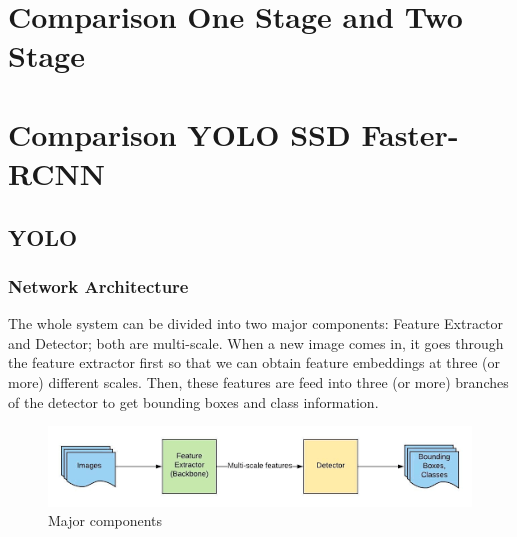 \section{Comparison One Stage and Two Stage}

\section{Comparison YOLO SSD Faster-RCNN}

    \subsection{YOLO}
        \subsubsection{Network Architecture}
            The whole system can be divided into two major components: Feature Extractor and Detector; both are multi-scale. When a new image comes in, it goes through the feature extractor first so that we can obtain feature embeddings at three (or more) different scales. Then, these features are feed into three (or more) branches of the detector to get bounding boxes and class information.
            \begin{figure}[H]
                \centering
                \includegraphics[width=0.8\linewidth]{img/yolo.png}
                \caption{Major components}
            \end{figure}
